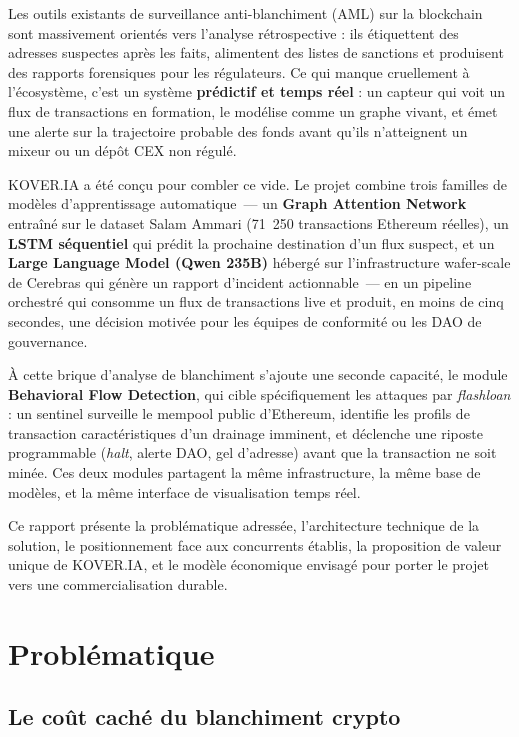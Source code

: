 \documentclass[11pt,a4paper]{article}
\begin{document}
Les outils existants de surveillance anti-blanchiment (AML) sur la
blockchain sont massivement orientés vers l'analyse rétrospective :
ils étiquettent des adresses suspectes après les faits, alimentent des
listes de sanctions et produisent des rapports forensiques pour les
régulateurs. Ce qui manque cruellement à l'écosystème, c'est un système
\textbf{prédictif et temps réel} : un capteur qui voit un flux de
transactions en formation, le modélise comme un graphe vivant, et
émet une alerte sur la trajectoire probable des fonds avant qu'ils
n'atteignent un mixeur ou un dépôt CEX non régulé.

\textsc{KOVER.IA} a été conçu pour combler ce vide. Le projet combine
trois familles de modèles d'apprentissage automatique~--- un
\textbf{Graph Attention Network} entraîné sur le dataset Salam Ammari
(71~250 transactions Ethereum réelles), un \textbf{LSTM séquentiel}
qui prédit la prochaine destination d'un flux suspect, et un
\textbf{Large Language Model (Qwen 235B)} hébergé sur l'infrastructure
wafer-scale de Cerebras qui génère un rapport d'incident actionnable~---
en un pipeline orchestré qui consomme un flux de transactions live et
produit, en moins de cinq secondes, une décision motivée pour les
équipes de conformité ou les DAO de gouvernance.

À cette brique d'analyse de blanchiment s'ajoute une seconde capacité,
le module \textbf{Behavioral Flow Detection}, qui cible spécifiquement
les attaques par \emph{flashloan} : un sentinel surveille le mempool
public d'Ethereum, identifie les profils de transaction caractéristiques
d'un drainage imminent, et déclenche une riposte programmable
(\emph{halt}, alerte DAO, gel d'adresse) avant que la transaction
ne soit minée. Ces deux modules partagent la même infrastructure, la
même base de modèles, et la même interface de visualisation temps réel.

Ce rapport présente la problématique adressée, l'architecture technique
de la solution, le positionnement face aux concurrents établis, la
proposition de valeur unique de \textsc{KOVER.IA}, et le modèle
économique envisagé pour porter le projet vers une commercialisation
durable.

\section{Problématique}

\subsection{Le coût caché du blanchiment crypto}
\end{document}
